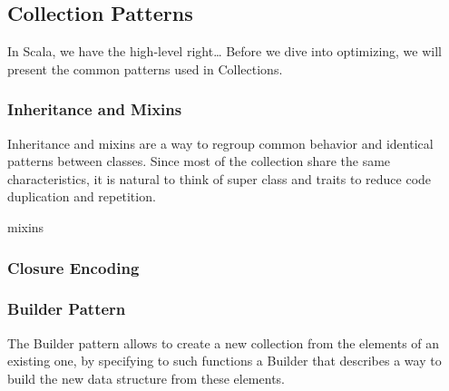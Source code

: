 % 
% 
% 
% 
% 

\subsection{Collection Patterns}

In Scala, we have the high-level right\ldots
Before we dive into optimizing, we will present the common patterns used in Collections.

\subsubsection{Inheritance and Mixins}

Inheritance and mixins are a way to regroup common behavior and identical patterns between classes. Since most of the collection share the same characteristics, it is natural to think of super class and traits to reduce code duplication and repetition.

mixins \cite{scalable-component-abstractions}

\subsubsection{Closure Encoding}



\subsubsection{Builder Pattern}

The Builder pattern allows to create a new collection from the elements of an
existing one, by specifying to such functions a Builder that describes a way to
build the new data structure from these elements.

